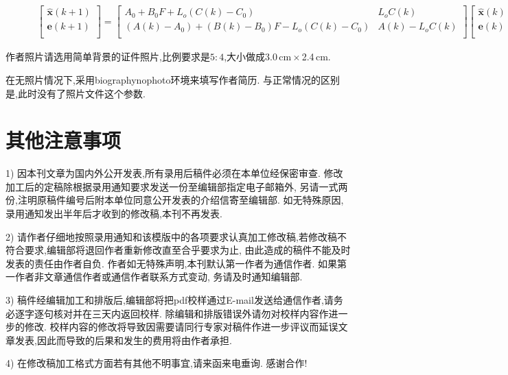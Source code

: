 \documentclass[fontset=mac]{aas}
\begin{document}
\begin{figure}
	\begin{align} 
		\left[
		\begin{array}{c}
			\hat{{\pmb x}}(k+1) \\
			{\pmb e}(k+1)\\
		\end{array}
		\right]=\left[
		\begin{array}{cc}
			A_0+B_0F+L_o(C(k)-C_0) & L_oC(k) \\
			(A(k)-A_0)+(B(k)-B_0)F-L_o(C(k)-C_0) & A(k)-L_oC(k) \\
		\end{array}
		\right]\left[
		\begin{array}{c}
			\hat{{\pmb x}}(k) \\
			{\pmb e} (k)\\
		\end{array}
		\right]\tag{4}
	\end{align}
\end{figure}
\vskip3mm

作者照片请选用简单背景的证件照片,比例要求是$5:4$,大小做成3.0\,cm\,$\times$\,2.4\,cm.

在无照片情况下,采用biographynophoto环境来填写作者简历.
与正常情况的区别是,此时没有了照片文件这个参数.

\section{其他注意事项}

1) 因本刊文章为国内外公开发表,所有录用后稿件必须在本单位经保密审查.
修改加工后的定稿除根据录用通知要求发送一份至编辑部指定电子邮箱外,
另请一式两份,注明原稿件编号后附本单位同意公开发表的介绍信寄至编辑部.
如无特殊原因,录用通知发出半年后才收到的修改稿,本刊不再发表.

2)
请作者仔细地按照录用通知和该模版中的各项要求认真加工修改稿,若修改稿不符合要求,编辑部将退回作者重新修改直至合乎要求为止,
由此造成的稿件不能及时发表的责任由作者自负.
作者如无特殊声明,本刊默认第一作者为通信作者.
如果第一作者非文章通信作者或通信作者联系方式变动,
务请及时通知编辑部.

3)
稿件经编辑加工和排版后,编辑部将把pdf校样通过E-mail发送给通信作者,请务必逐字逐句核对并在三天内返回校样.
除编辑和排版错误外请勿对校样内容作进一步的修改.
校样内容的修改将导致因需要请同行专家对稿件作进一步评议而延误文章发表,因此而导致的后果和发生的费用将由作者承担.

4) 在修改稿加工格式方面若有其他不明事宜,请来函来电垂询. 感谢合作!
\end{document}
